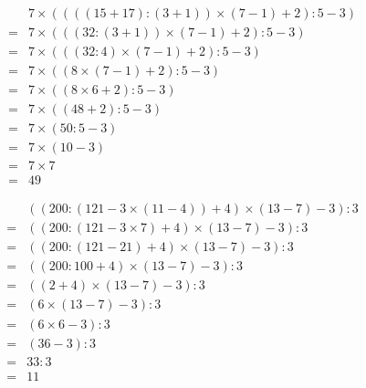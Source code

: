 \separe

\begin{multicols}{2}
  \begin{align*}
    &7\times ((((15+17):(3+1))\times (7-1)+2):5-3)\\
    =&7\times (((32:(3+1))\times (7-1)+2):5-3)\\
    =&7\times (((32:4)\times (7-1)+2):5-3)\\
    =&7\times ((8\times (7-1)+2):5-3)\\
    =&7\times ((8\times 6+2):5-3)\\
    =&7\times ((48+2):5-3)\\
    =&7\times (50:5-3)\\
    =&7\times (10-3)\\
    =&7\times 7\\
    =&49
  \end{align*}

  \begin{align*}
    &((200:(121-3\times (11-4))+4)\times (13-7)-3):3\\
    =&((200:(121-3\times 7)+4)\times (13-7)-3):3\\
    =&((200:(121-21)+4)\times (13-7)-3):3\\
    =&((200:100+4)\times (13-7)-3):3\\
    =&((2+4)\times (13-7)-3):3\\
    =&(6\times (13-7)-3):3\\
    =&(6\times 6-3):3\\
    =&(36-3):3\\
    =&33:3\\
    =&11
  \end{align*}
\end{multicols}